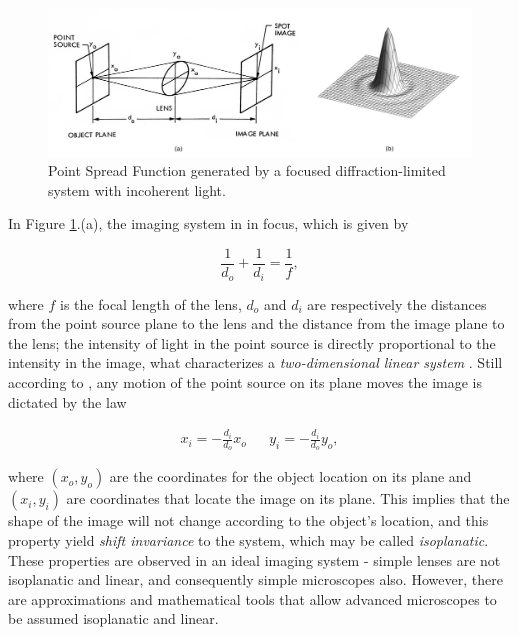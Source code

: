 \begin{figure}[htb]
	\centering
	\caption{\label{fig:point_spread_function} Point Spread Function generated by a focused diffraction-limited system with incoherent light.} 
	\begin{center}
	    \includegraphics[scale=0.235]{images/point_spread_function.jpeg}
	\end{center}
	\centering
\end{figure}

In Figure \ref{fig:point_spread_function}.(a), the imaging system in in focus, which is given by

\begin{equation}
\label{eqn:lens_focus}
\frac{1}{d_{o}} + \frac{1}{d_{i}} = \frac{1}{f},
\end{equation}

\noindent where $f$ is the focal length of the lens, $d_{o}$ and $d_{i}$ are respectively the distances from the point source plane to the lens and the distance from the image plane to the lens; the intensity of light in the point source is directly proportional to the intensity in the image, what characterizes a \emph{two-dimensional linear system} \cite{castleman1996digital}. Still according to , any motion of the point source on its plane moves the image is dictated by the law

\begin{align}
\label{eqn:isoplanatic_motion}
x_{i} = -\frac{d_{i}}{d_{o}}x_{o}
&&
y_{i} = -\frac{d_{i}}{d_{o}}y_{o},
\end{align}

\noindent where $(x_{o},y_{o})$ are the coordinates for the object location on its plane and $(x_{i},y_{i})$ are coordinates that locate the image on its plane. This implies that the shape of the image will not change according to the object's location, and this property yield \emph{shift invariance} to the system, which may be called \emph{isoplanatic}. These properties are observed in an ideal imaging system - simple lenses are not isoplanatic and linear, and  consequently simple microscopes also. However, there are approximations and mathematical tools that allow advanced microscopes to be assumed isoplanatic and linear.

